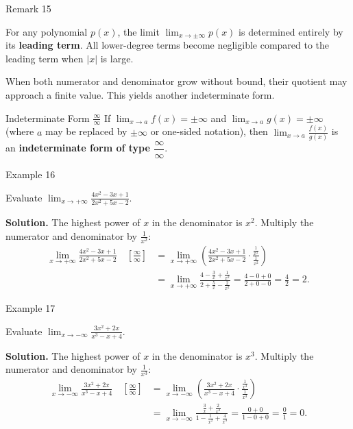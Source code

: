 \begin{remarkbox}{Remark 15}

For any polynomial \(p(x)\), the limit \(\lim_{x \to \pm\infty} p(x)\) is determined entirely by its \textbf{leading term}. All lower-degree terms become negligible compared to the leading term when \(|x|\) is large.
\end{remarkbox}

\bigskip

When both numerator and denominator grow without bound, their quotient may approach a finite value. This yields another indeterminate form.

\begin{definitionbox}{Indeterminate Form \(\frac{\infty}{\infty}\)}
If \(\displaystyle\lim_{x \to a} f(x) = \pm\infty\) and \(\displaystyle\lim_{x \to a} g(x) = \pm\infty\) (where \(a\) may be replaced by \(\pm\infty\) or one-sided notation), then \(\displaystyle\lim_{x \to a} \frac{f(x)}{g(x)}\) is an \textbf{indeterminate form of type \(\dfrac{\infty}{\infty}\)}.
\end{definitionbox}


\begin{examplebox}{Example 16}

Evaluate \(\displaystyle\lim_{x \to +\infty} \frac{4x^{2} - 3x + 1}{2x^{2} + 5x - 2}\).

\medskip
\textbf{Solution.}
The highest power of \(x\) in the denominator is \(x^{2}\). Multiply the numerator and denominator by \(\frac{1}{x^{2}}\):
\begin{align*}
\lim_{x \to +\infty} \frac{4x^{2} - 3x + 1}{2x^{2} + 5x - 2} \quad \left[\frac{\infty}{\infty}\right]
    &= \lim_{x \to +\infty} \left( \frac{4x^{2} - 3x + 1}{2x^{2} + 5x - 2} \cdot \frac{\frac{1}{x^{2}}}{\frac{1}{x^{2}}} \right) \\[10pt]
    &= \lim_{x \to +\infty} \frac{4 - \frac{3}{x} + \frac{1}{x^{2}}}{2 + \frac{5}{x} - \frac{2}{x^{2}}}
     = \frac{4 - 0 + 0}{2 + 0 - 0}
     = \frac{4}{2}
     = 2.
\end{align*}
\end{examplebox}


\begin{examplebox}{Example 17}

Evaluate \(\displaystyle\lim_{x \to -\infty} \frac{3x^{2} + 2x}{x^{3} - x + 4}\).

\medskip
\textbf{Solution.}
The highest power of \(x\) in the denominator is \(x^{3}\). Multiply the numerator and denominator by \(\frac{1}{x^{3}}\):
\begin{align*}
\lim_{x \to -\infty} \frac{3x^{2} + 2x}{x^{3} - x + 4} \quad \left[\frac{\infty}{\infty}\right]
    &= \lim_{x \to -\infty} \left( \frac{3x^{2} + 2x}{x^{3} - x + 4} \cdot \frac{\frac{1}{x^{3}}}{\frac{1}{x^{3}}} \right) \\[10pt]
    &= \lim_{x \to -\infty} \frac{\frac{3}{x} + \frac{2}{x^{2}}}{1 - \frac{1}{x^{2}} + \frac{4}{x^{3}}}
     = \frac{0 + 0}{1 - 0 + 0}
     = \frac{0}{1}
     = 0.
\end{align*}
\end{examplebox}


